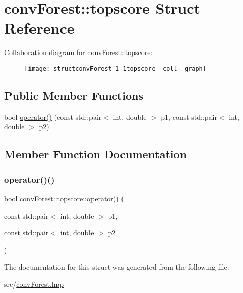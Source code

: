 \hypertarget{structconvForest_1_1topscore}{}\section{conv\+Forest\+:\+:topscore Struct Reference}
\label{structconvForest_1_1topscore}


Collaboration diagram for conv\+Forest\+:\+:topscore\+:\nopagebreak
\begin{figure}[H]
\begin{center}
\leavevmode
\texttt{[image: structconvForest\_1\_1topscore\_\_coll\_\_graph]}
\end{center}
\end{figure}
\subsection*{Public Member Functions}
\begin{DoxyCompactItemize}
\item 
bool \hyperlink{structconvForest_1_1topscore_aaea88f336c3f2595f2505f6acd0e1958}{operator()} (const std\+::pair$<$ int, double $>$ p1, const std\+::pair$<$ int, double $>$ p2)
\end{DoxyCompactItemize}


\subsection{Member Function Documentation}
\mbox{\label{structconvForest_1_1topscore_aaea88f336c3f2595f2505f6acd0e1958}} 
\subsubsection{\texorpdfstring{operator()()}{operator()()}}
{\footnotesize\ttfamily bool conv\+Forest\+::topscore\+::operator() (\begin{DoxyParamCaption}\item[{const std\+::pair$<$ int, double $>$}]{p1,  }\item[{const std\+::pair$<$ int, double $>$}]{p2 }\end{DoxyParamCaption})\hspace{0.3cm}{\ttfamily [inline]}}



The documentation for this struct was generated from the following file\+:\begin{DoxyCompactItemize}
\item 
src/\hyperlink{convForest_8hpp}{conv\+Forest.\+hpp}\end{DoxyCompactItemize}
